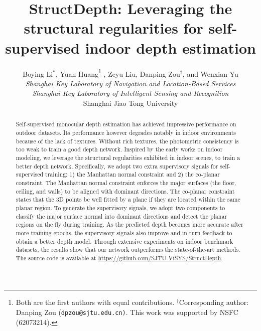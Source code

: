 \documentclass[10pt,twocolumn,letterpaper]{article}
\begin{document}
	


\title{StructDepth: Leveraging the structural regularities 
	for self-supervised indoor depth estimation}

\author{Boying Li$^{*}$, Yuan Huang\thanks{Both are the first authors with equal contributions. $^{\dag}$Corresponding author: Danping Zou ({\tt\small dpzou@sjtu.edu.cn)}. This work was supported by NSFC (62073214).} , Zeyu Liu, Danping Zou$^{\dag}$, and Wenxian Yu\\
	\emph{Shanghai Key Laboratory of Navigation and Location-Based Services}\\
	\emph{Shanghai Key Laboratory of Intelligent Sensing and Recognition}\\ Shanghai Jiao Tong University\\
} 

\maketitle


\begin{abstract}
	Self-supervised monocular depth estimation has achieved impressive performance on outdoor datasets. Its performance however degrades notably in indoor environments because of the lack of textures. Without rich textures, the photometric consistency is too weak to train a good depth network. Inspired by the early works on indoor modeling, we leverage the structural regularities exhibited in indoor scenes, to train a better depth network. Specifically, we adopt two extra supervisory signals for self-supervised training: 1) the Manhattan normal constraint and 2) the co-planar constraint. The Manhattan normal constraint enforces the major surfaces (the floor, ceiling, and walls) to be aligned with dominant directions. The co-planar constraint states that the 3D points be well fitted by a plane if they are located within the same planar region. To generate the supervisory signals, we adopt two components to classify the major surface normal into dominant directions and detect the planar regions on the fly during training. As the predicted depth becomes more accurate after more training epochs, the supervisory signals also improve and in turn feedback to obtain a better depth model. Through extensive experiments on indoor benchmark datasets, the results show that our network outperforms the state-of-the-art methods. The source code is available at  \url{https://github.com/SJTU-ViSYS/StructDepth}.  \end{abstract}
\end{document}

